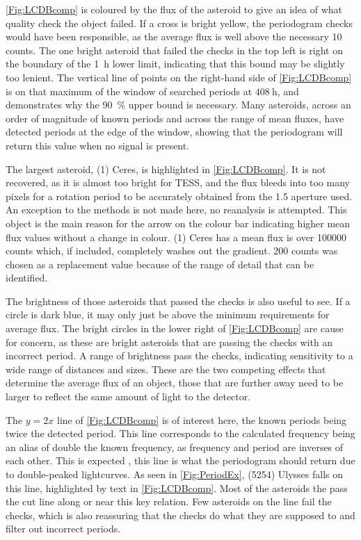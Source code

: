 \documentclass{UCreport}
\begin{document}
\autoref{Fig:LCDBcomp} is coloured by the flux of the asteroid to give an idea of what quality check the object failed. 
If a cross is bright yellow, the periodogram checks would have been responsible, as the average flux is well above the necessary 10 counts.
The one bright asteroid that failed the checks in the top left is right on the boundary of the \qty{1}{\hour} lower limit, indicating that this bound may be slightly too lenient.
The vertical line of points on the right-hand side of \autoref{Fig:LCDBcomp} is on that maximum of the window of searched periods at $\qty{408}{\hour}$, and demonstrates why the \qty{90}{\percent} upper bound is necessary.
Many asteroids, across an order of magnitude of known periods and across the range of mean fluxes, have detected periods at the edge of the window, showing that the periodogram will return this value when no signal is present.

The largest asteroid, (1) Ceres, is highlighted in \autoref{Fig:LCDBcomp}. 
It is not recovered, as it is almost too bright for TESS, and the flux bleeds into too many pixels for a rotation period to be accurately obtained from the \qty{1.5}{\px} aperture used.
An exception to the methods is not made here, no reanalysis is attempted.
This object is the main reason for the arrow on the colour bar indicating higher mean flux values without a change in colour.
(1) Ceres has a mean flux is over 100000 counts which, if included, completely washes out the gradient.
200 counts was chosen as a replacement value because of the range of detail that can be identified. 


The brightness of those asteroids that passed the checks is also useful to see.
If a circle is dark blue, it may only just be above the minimum requirements for average flux.
The bright circles in the lower right of \autoref{Fig:LCDBcomp} are cause for concern, as these are bright asteroids that are passing the checks with an incorrect period. 
A range of brightness pass the checks, indicating sensitivity to a wide range of distances and sizes.
These are the two competing effects that determine the average flux of an object, those that are further away need to be larger to reflect the same amount of light to the detector.

The $y=2x$ line of \autoref{Fig:LCDBcomp} is of interest here, the known periods being twice the detected period.
This line corresponds to the calculated frequency being an alias of double the known frequency, as frequency and period are inverses of each other.
This is expected \citep{McNeill2023}, this line is what the periodogram should return due to double-peaked lightcurves.
As seen in \autoref{Fig:PeriodEx}, (5254) Ulysses falls on this line, highlighted by text in \autoref{Fig:LCDBcomp}.
Most of the asteroids the pass the cut line along or near this key relation.
Few asteroids on the line fail the checks, which is also reassuring that the checks do what they are supposed to and filter out incorrect periods.
\end{document}
